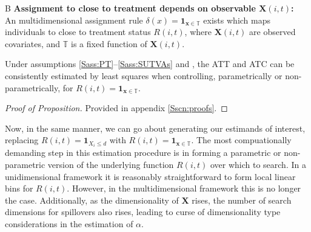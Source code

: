 \begin{assumption}{4}{B}
\label{Sass:SUTVAlM}
\textbf{Assignment to close to treatment depends on observable $\mathbf{X}(i,t)$:} \\ 
An multidimensional assignment rule $\delta(x)=\mathbf{1}_{\mathbf{x}\in \mathbb{T}}$ 
exists which maps individuals to close to treatment status $R(i,t)$, where 
$\mathbf{X}(i,t)$ are observed covariates, and $\mathbb{T}$ is a fixed 
function of $\mathbf{X}(i,t)$.
\end{assumption}

\begin{proposition}
\label{Pass:ATTnonP}
Under assumptions \ref{Sass:PT}--\ref{Sass:SUTVAs} and , 
the ATT and ATC can be consistently estimated by least squares when controlling, 
parametrically or non-parametrically, for $R(i,t)=\mathbf{1}_{\mathbf{x}\in
\mathbb{T}}$. 
\end{proposition}
\begin{proof}[Proof of Proposition]
Provided in appendix \ref{Sscn:proofs}.
\end{proof}

Now, in the same manner, we can go about generating our estimands of interest, 
replacing $R(i,t)=\mathbf{1}_{X_i\leq d}$ with $R(i,t)=\mathbf{1}_{\mathbf{x}\in 
\mathbb{T}}$. The most compuationally demanding step in this estimation procedure 
is in forming a parametric or non-parametric version of the underlying function 
$R(i,t)$ over which to search.  In a unidimensional framework it is reasonably 
straightforward to form local linear bins for $R(i,t)$.  However, in the 
multidimensional framework this is no longer the case.  Additionally, as the 
dimensionality of $\mathbf{X}$ rises, the number of search dimensions for 
spillovers also rises, leading to curse of dimensionality type considerations in 
the estimation of $\alpha$.

